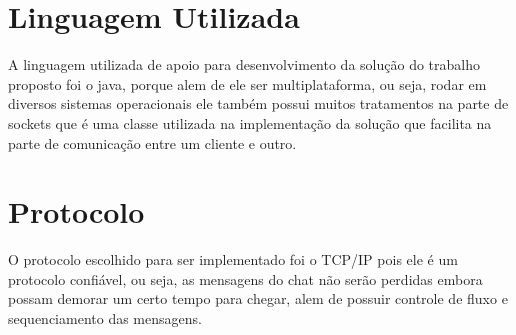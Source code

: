 \documentclass{abnt}
\begin{document}
	\section{Linguagem Utilizada}	
		A linguagem utilizada de apoio para desenvolvimento da solução do trabalho proposto foi o java, porque alem de ele ser multiplataforma, ou seja, rodar em diversos sistemas operacionais ele também possui muitos tratamentos na parte de sockets que é uma classe utilizada na implementação da solução que facilita na parte de comunicação entre um cliente e outro.
	
	\section{Protocolo}		
		O protocolo escolhido para ser implementado foi o TCP/IP pois ele é um protocolo confiável, ou seja, as mensagens do chat não serão perdidas embora possam demorar um certo tempo para chegar, alem de possuir controle de fluxo e sequenciamento das mensagens.



\clearpage
\nocite{*}
		
		
\end{document}
